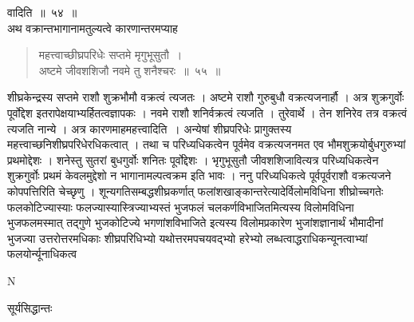 \documentclass[11pt, openany]{book}
\begin{document}
\begin{sloppypar}
\noindent वादिति~॥~५४~॥\\
\noindent अथ वक्रान्तभागानामतुल्यत्वे कारणान्तरमप्याह\textendash
\end{sloppypar}
\begin{quote}

{\ssi महत्त्वाच्छीघ्रपरिधेः सप्तमे मृगुभूसुतौ~।\\
अष्टमे जीवशशिजौ नवमे तु शनैश्चरः~॥~५५~॥}
\end{quote}
\begin{sloppypar}
शीघ्रकेन्द्रस्य सप्तमे राशौ शुक्रभौमौ वक्रत्वं त्यजतः । अष्टमे राशौ गुरुबुधौ वक्रत्यजनार्हौ । अत्र शुक्रगुर्वोः पूर्वोद्देश इतरापेक्षयाभ्यर्हितत्वज्ञापकः । नवमे राशौ शनिर्वक्रत्वं त्यजति । तुरेवार्थे । तेन शनिरेव तत्र वक्रत्वं त्यजति नान्ये । अत्र कारणमाह\textendash महत्त्वादिति~। अन्येषां शीघ्रपरिधेः प्रागुक्तस्य महत्त्वाच्छनिशीघ्रपरिधेरधिकत्वात् । तथा च परिध्यधिकत्वेन पूर्वमेव वक्रत्यजनमत एव भौमशुक्रयोर्बुधगुरुभ्यां प्रथमोद्देशः । शनेस्तु सुतरां बुधगुर्वोः शनितः पूर्वोद्देशः । भृगुभूसुतौ जीवशशिजावित्यत्र परिध्यधिकत्वेन शुक्रगुर्वोः प्रथमं केवलमुद्देशो न भागानामल्पत्वक्रम इति भावः । ननु परिध्यधिकत्वे पूर्वपूर्वराशौ वक्रत्यजने कोपपत्तिरिति चेच्छृणु । शून्यगतिसम्बद्धशीघ्रकर्णात् फलांशखाङ्कान्तरेत्यादेर्विलोमविधिना शीघ्रोच्चगतेः फलकोटिज्यास्याः फलज्यास्यास्त्रिज्याभ्यस्तं भुजफलं चलकर्णविभाजितमित्यस्य विलोमविधिना भुजफलमस्मात् तद्गुणे भुजकोटिज्ये भगणांशविभाजिते इत्यस्य विलोमप्रकारेण भुजांशज्ञानार्थं भौमादीनां भुजज्या उत्तरोत्तरमधिकाः शीघ्रपरिधिभ्यो यथोत्तरमपचयवद्भ्यो हरेभ्यो लब्धत्वाद्धराधिकन्यूनत्वाभ्यां फलयोर्न्यूनाधिकत्व\textendash
\end{sloppypar}

{\tiny{N}}
\newpage


\hspace{4cm} सूर्यसिद्धान्तः
\vspace{1cm}
\end{document}
